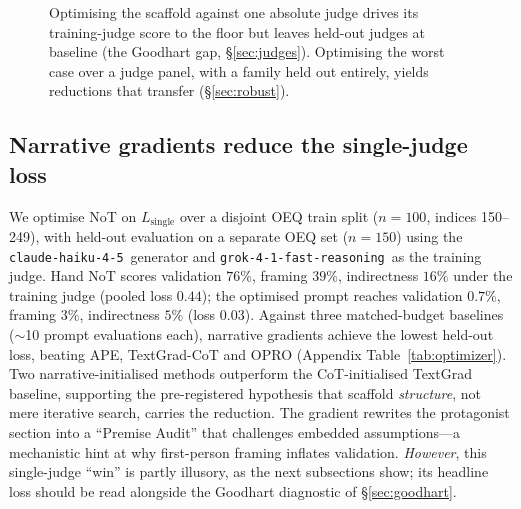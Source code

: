 \documentclass[11pt]{article}
\newcommand{\haiku}{\texttt{claude-haiku-4-5}}
\newcommand{\grok}{\texttt{grok-4-1-fast-reasoning}}
\begin{document}
\begin{figure}[t]
\centering
{}
\caption{Optimising the scaffold against one absolute judge drives its training-judge score to the floor
but leaves held-out judges at baseline (the Goodhart gap, \S\ref{sec:judges}). Optimising the worst case
over a judge panel, with a family held out entirely, yields reductions that transfer
(\S\ref{sec:robust}).}
\label{fig:pipeline}
\end{figure}

\subsection{Narrative gradients reduce the single-judge loss}
We optimise NoT on $L_{\text{single}}$ over a disjoint OEQ train split ($n{=}100$, indices 150--249),
with held-out evaluation on a separate OEQ set ($n{=}150$) using the \haiku\ generator and \grok\ as the
training judge. Hand NoT scores validation $76\%$, framing $39\%$, indirectness $16\%$ under the
training judge (pooled loss $0.44$); the optimised prompt reaches validation $0.7\%$, framing $3\%$,
indirectness $5\%$ (loss $0.03$). Against three matched-budget baselines ($\sim$10 prompt evaluations
each), narrative gradients achieve the lowest held-out loss, beating APE, TextGrad-CoT and OPRO
(Appendix Table~\ref{tab:optimizer}). Two narrative-initialised methods outperform the CoT-initialised TextGrad
baseline, supporting the pre-registered hypothesis that scaffold \emph{structure}, not mere iterative
search, carries the reduction. The gradient rewrites the protagonist section into a ``Premise Audit''
that challenges embedded assumptions---a mechanistic hint at why first-person framing inflates
validation. \emph{However}, this single-judge ``win'' is partly illusory, as the next subsections show;
its headline loss should be read alongside the Goodhart diagnostic of \S\ref{sec:goodhart}.
\end{document}
